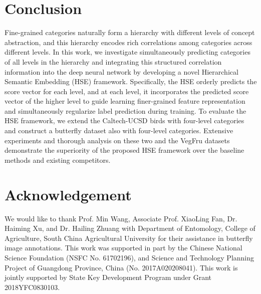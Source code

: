 \documentclass[sigconf]{acmart}
\begin{document}
\section{Conclusion}
Fine-grained categories naturally form a hierarchy with different levels of concept abstraction, and this hierarchy encodes rich correlations among categories across different levels. In this work, we investigate simultaneously predicting categories of all levels in the hierarchy and integrating this structured correlation information into the deep neural network by developing a novel Hierarchical Semantic Embedding (HSE) framework. Specifically, the HSE orderly predicts the score vector for each level, and at each level, it incorporates the predicted score vector of the higher level to guide learning finer-grained feature representation and simultaneously regularize label prediction during training. To evaluate the HSE framework, we extend the Caltech-UCSD birds with four-level categories and construct a butterfly dataset also with four-level categories. Extensive experiments and thorough analysis on these two and the VegFru datasets demonstrate the superiority of the proposed HSE framework over the baseline methods and existing competitors.

\section*{Acknowledgement}
We would like to thank Prof. Min Wang, Associate Prof. XiaoLing Fan, Dr. Haiming Xu, and Dr. Hailing Zhuang with Department of Entomology, College of Agriculture, South China Agricultural University for their assistance in butterfly image annotations. This work was supported in part by the Chinese National Science Foundation (NSFC No. 61702196), and Science and Technology Planning Project of Guangdong Province, China (No. 2017A020208041).  This work is jointly supported by State Key Development Program under Grant 2018YFC0830103.




\end{document}
